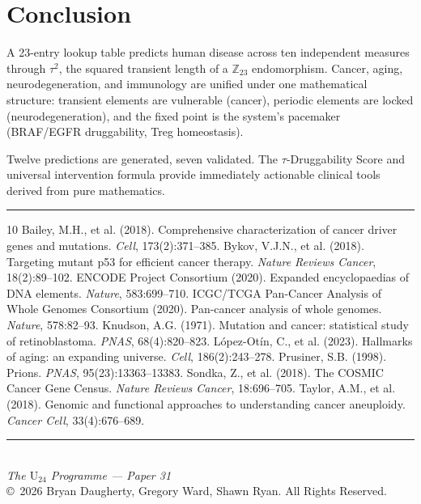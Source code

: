 \documentclass[11pt,a4paper]{article}
\begin{document}
\section{Conclusion}

A 23-entry lookup table predicts human disease across ten independent measures through $\tau^2$, the squared transient length of a $\mathbb{Z}_{23}$ endomorphism. Cancer, aging, neurodegeneration, and immunology are unified under one mathematical structure: transient elements are vulnerable (cancer), periodic elements are locked (neurodegeneration), and the fixed point is the system's pacemaker (BRAF/EGFR druggability, Treg homeostasis).

Twelve predictions are generated, seven validated. The $\tau$-Druggability Score and universal intervention formula provide immediately actionable clinical tools derived from pure mathematics.

\vspace{1cm}
\textcolor{goldaccent}{\rule{\textwidth}{0.5pt}}


\begin{thebibliography}{10}
 Bailey, M.H., et al. (2018). Comprehensive characterization of cancer driver genes and mutations. \emph{Cell}, 173(2):371--385.
 Bykov, V.J.N., et al. (2018). Targeting mutant p53 for efficient cancer therapy. \emph{Nature Reviews Cancer}, 18(2):89--102.
 ENCODE Project Consortium (2020). Expanded encyclopaedias of DNA elements. \emph{Nature}, 583:699--710.
 ICGC/TCGA Pan-Cancer Analysis of Whole Genomes Consortium (2020). Pan-cancer analysis of whole genomes. \emph{Nature}, 578:82--93.
 Knudson, A.G. (1971). Mutation and cancer: statistical study of retinoblastoma. \emph{PNAS}, 68(4):820--823.
 L\'{o}pez-Ot\'{i}n, C., et al. (2023). Hallmarks of aging: an expanding universe. \emph{Cell}, 186(2):243--278.
 Prusiner, S.B. (1998). Prions. \emph{PNAS}, 95(23):13363--13383.
 Sondka, Z., et al. (2018). The COSMIC Cancer Gene Census. \emph{Nature Reviews Cancer}, 18:696--705.
 Taylor, A.M., et al. (2018). Genomic and functional approaches to understanding cancer aneuploidy. \emph{Cancer Cell}, 33(4):676--689.
\end{thebibliography}

\vfill
\begin{center}
\textcolor{goldaccent}{\rule{4cm}{0.5pt}}\\[4pt]
{\small\color{navylight}\textit{The $\mathrm{U}_{24}$ Programme --- Paper 31}}\\[2pt]
{\small\color{navylight}\copyright\ 2026 Bryan Daugherty, Gregory Ward, Shawn Ryan. All Rights Reserved.}
\end{center}
\end{document}
